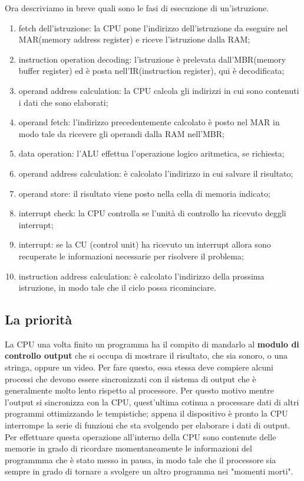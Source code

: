 \documentclass{article}
\begin{document}
Ora descriviamo in breve quali sono le fasi di esecuzione di un'istruzione.
\begin{enumerate}
	\item fetch dell'istruzione: la CPU pone l'indirizzo dell'istruzione da eseguire nel MAR(memory address register) e riceve l'istruzione dalla RAM;

	\item instruction operation decoding: l'istruzione è prelevata dall'MBR(memory buffer register) ed è posta nell'IR(instruction register), qui è decodificata;

	\item operand address calculation: la CPU calcola gli indirizzi in cui sono contenuti i dati che sono elaborati;

	\item operand fetch: l'indirizzo precedentemente calcolato è posto nel MAR in modo tale da ricevere gli operandi dalla RAM nell'MBR;

	\item data operation: l'ALU effettua l'operazione logico aritmetica, se richiesta;

	\item operand address calculation: è calcolato l'indirizzo in cui salvare il risultato;

	\item operand store: il risultato viene posto nella cella di memoria indicato;

	\item interrupt check: la CPU controlla se l'unità di controllo ha ricevuto deggli interrupt;

	\item interrupt: se la CU (control unit) ha ricevuto un interrupt allora sono recuperate le informazioni necessarie per risolvere il problema;

	\item instruction address calculation: è calcolato l'indirizzo della prossima istruzione, in modo tale che il ciclo possa ricominciare.
\end{enumerate}


\subsection{La priorità} \label{priorita}
La CPU una volta finito un programma ha il compito di mandarlo al \textbf{modulo di controllo output} che si occupa di mostrare il risultato, che sia sonoro, o una stringa, oppure un video. Per fare questo, essa stessa deve compiere alcuni processi che devono essere sincronizzati con il sistema di output che è generalmente molto lento rispetto al processore. Per questo motivo mentre l'output si sincronizza con la CPU, quest'ultima cotinua a processare dati di altri programmi ottimizzando le tempistiche; appena il dispositivo è pronto la CPU interrompe la serie di funzioni che sta svolgendo per elaborare i dati di output. Per effettuare questa operazione all'interno della CPU sono contenute delle memorie in grado di ricordare momentaneamente le informazioni del programmma che è stato messo in pausa, in modo tale che il processore sia sempre in grado di tornare a svolgere un altro programma nei "momenti morti".
\end{document}
